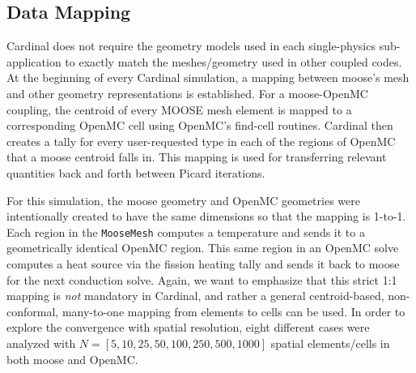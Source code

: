 \documentclass[letterpaper]{mc2023}
\begin{document}
\subsection{Data Mapping}
Cardinal does not require the geometry models used in each single-physics sub-application to exactly match the meshes/geometry used in
other coupled codes. At the beginning of every Cardinal simulation, a mapping between \gls{moose}'s mesh and other geometry representations
is established. For a \gls{moose}-OpenMC coupling, the centroid of every MOOSE mesh element is mapped to a corresponding OpenMC cell using
OpenMC's find-cell routines. Cardinal then creates a tally for every user-requested type in each of the regions of OpenMC that a \gls{moose}
centroid falls in. This mapping is used for transferring relevant quantities back and forth between Picard iterations. 

For this simulation, the \gls{moose} geometry and OpenMC geometries were intentionally created to have the same dimensions so that the
mapping is 1-to-1. Each region in the \texttt{MooseMesh} computes a temperature and sends it to a geometrically identical OpenMC region.
This same region in an OpenMC solve computes a heat source via the fission heating tally and sends it back to \gls{moose} for the next
conduction solve. Again, we want to emphasize that this strict 1:1 mapping is {\it not} mandatory in Cardinal, and rather a general
centroid-based, non-conformal, many-to-one mapping from elements to cells can be used. In order to explore the convergence with spatial
resolution, eight different cases were analyzed with $N=[5, 10, 25, 50, 100, 250, 500, 1000]$ spatial elements/cells in both \gls{moose}
and OpenMC.
\end{document}
